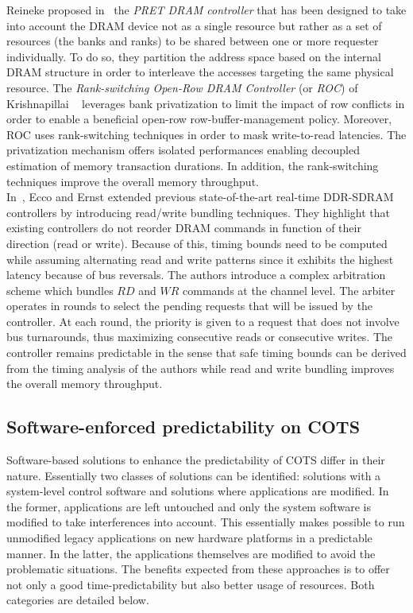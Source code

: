 \documentclass[main.tex]{subfiles}
\begin{document}
Reineke \etal proposed in~\cite{Reineke2011} the \emph{PRET DRAM controller}
that has been designed to take into account the DRAM device not as a single
resource but rather as a set of resources (the banks and ranks) to be shared
between one or more requester individually. To do so, they partition the
address space based on the internal DRAM structure in order to interleave the
accesses targeting the same physical resource.  The \emph{Rank-switching
Open-Row DRAM Controller} (or \emph{ROC}) of Krishnapillai
\etal~\cite{Krishnapillai2014} leverages bank privatization to limit the impact
of row conflicts in order to enable a beneficial open-row row-buffer-management
policy. Moreover, ROC uses rank-switching techniques in order to mask
write-to-read latencies. The privatization mechanism offers isolated
performances enabling decoupled estimation of memory transaction durations. In
addition, the rank-switching techniques improve the overall memory
throughput.\\ 

In~\cite{Ecco2015}, Ecco and Ernst extended previous state-of-the-art real-time
DDR-SDRAM controllers by introducing read/write bundling techniques. They
highlight that existing controllers do not reorder DRAM commands in function of
their direction (read or write). Because of this, timing bounds need to be
computed while assuming alternating read and write patterns since it exhibits
the highest latency because of bus reversals. The authors introduce a complex
arbitration scheme which bundles $RD$ and $WR$ commands at the channel level.
The arbiter operates in rounds to select the pending requests that will be
issued by the controller. At each round, the priority is given to a request
that does not involve bus turnarounds, thus maximizing consecutive reads or
consecutive writes. The controller remains predictable in the sense that safe
timing bounds can be derived from the timing analysis of the authors while read
and write bundling improves the overall memory throughput.


\subsection{Software-enforced predictability on COTS}
\label{ssec_stateOfTheArt_softwareEnforcedPredictability}

Software-based solutions to enhance the predictability of COTS differ in their
nature. Essentially two classes of solutions can be identified: solutions with
a system-level control software and solutions where applications are modified.
In the former, applications are left untouched and only the system software is
modified to take interferences into account. This essentially makes possible to
run unmodified legacy applications on new hardware platforms in a predictable
manner. In the latter, the applications themselves are modified to avoid the
problematic situations. The benefits expected from these approaches is to offer
not only a good time-predictability but also better usage of resources. Both
categories are detailed below.
\end{document}
